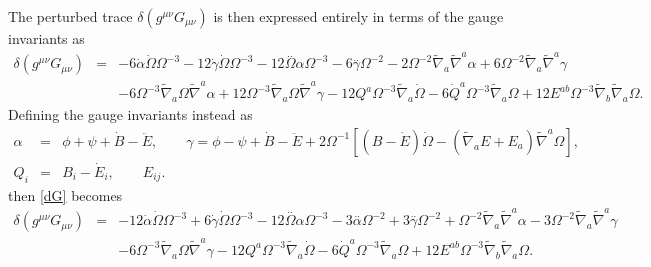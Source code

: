 \documentclass[10pt,letterpaper]{article}
\numberwithin{equation}{section}
\begin{document}
The perturbed trace $\delta(g^{\mu\nu} G_{\mu\nu})$ is then expressed entirely in terms of the gauge invariants as
\begin{eqnarray}
\delta(g^{\mu\nu} G_{\mu\nu})&=& -6 \dot{\alpha} \dot{\Omega} \Omega^{-3} - 12 \dot{\gamma} \dot{\Omega} \Omega^{-3} - 12 \overset{..}{\Omega} \alpha \Omega^{-3} - 6 \overset{..}{\gamma} \Omega^{-2} - 2 \Omega^{-2} \tilde{\nabla}_{a}\tilde{\nabla}^{a}\alpha + 6 \Omega^{-2} \tilde{\nabla}_{a}\tilde{\nabla}^{a}\gamma \nonumber \\ 
&& - 6 \Omega^{-3} \tilde{\nabla}_{a}\Omega \tilde{\nabla}^{a}\alpha + 12 \Omega^{-3} \tilde{\nabla}_{a}\Omega \tilde{\nabla}^{a}\gamma -12 Q^{a} \Omega^{-3} \tilde{\nabla}_{a}\dot{\Omega} - 6 \dot{Q}^{a} \Omega^{-3} \tilde{\nabla}_{a}\Omega +12 E^{ab} \Omega^{-3} \tilde{\nabla}_{b}\tilde{\nabla}_{a}\Omega.
\label{dGtr1}
\end{eqnarray}
Defining the gauge invariants instead as
\begin{eqnarray}
\alpha &=& \phi + \psi +\dot B - \ddot E,\qquad \gamma =\phi- \psi+\dot B - \ddot E + 2\Omega^{-1}[(B-\dot E)\dot\Omega - (\tilde\nabla_a E + E_a)\tilde\nabla^a \Omega],
\nonumber\\
Q_i&=& B_i - \dot E_i,\qquad E_{ij}.
\end{eqnarray}
then \eqref{dG} becomes
\begin{eqnarray}
\delta(g^{\mu\nu} G_{\mu\nu})&=& -12 \dot{\alpha} \dot{\Omega} \Omega^{-3} + 6 \dot{\gamma} \dot{\Omega} \Omega^{-3} - 12 \overset{..}{\Omega} \alpha \Omega^{-3} - 3 \overset{..}{\alpha} \Omega^{-2} + 3 \overset{..}{\gamma} \Omega^{-2} + \Omega^{-2} \tilde{\nabla}_{a}\tilde{\nabla}^{a}\alpha - 3 \Omega^{-2} \tilde{\nabla}_{a}\tilde{\nabla}^{a}\gamma \nonumber \\ 
&& - 6 \Omega^{-3} \tilde{\nabla}_{a}\Omega \tilde{\nabla}^{a}\gamma -12 Q^{a} \Omega^{-3} \tilde{\nabla}_{a}\dot{\Omega} - 6 \dot{Q}^{a} \Omega^{-3} \tilde{\nabla}_{a}\Omega +12 E^{ab} \Omega^{-3} \tilde{\nabla}_{b}\tilde{\nabla}_{a}\Omega .
\end{eqnarray}

\end{document}

